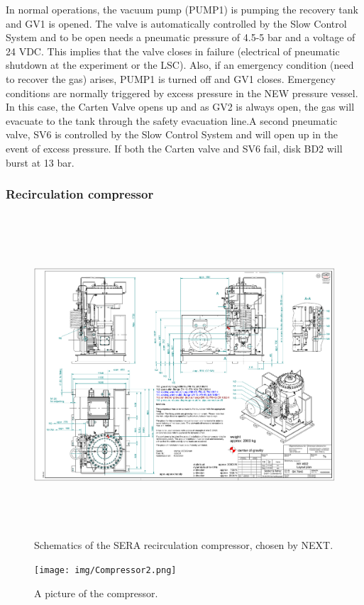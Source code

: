 In normal operations, the vacuum pump (PUMP1) is pumping the recovery tank and GV1 is opened. The valve is automatically controlled by the Slow Control System and to be open needs a pneumatic pressure of 4.5-5 bar and a voltage of 24 VDC. This implies that the valve closes in failure (electrical of pneumatic shutdown at the experiment or the LSC). Also, if an emergency condition (need to recover the gas) arises, PUMP1 is turned off and GV1 closes. Emergency conditions are normally triggered by excess pressure in the NEW pressure vessel. In this case, the Carten Valve opens up and as GV2 is always open, the gas will evacuate to the tank through the safety evacuation line.A second pneumatic valve, SV6 is controlled by the Slow Control System and will open up in the event of excess pressure. If both the Carten valve and SV6 fail, disk BD2 will burst at 13 bar. 

\subsubsection*{Recirculation compressor}

\begin{figure}[hpt!]
\centering
\includegraphics[height=12cm]{img/Pump.pdf}
\caption{Schematics of the SERA recirculation compressor, chosen by NEXT.} \label{fig:pump}
\end{figure}

\begin{figure}[hpt!]
\centering
\texttt{[image: img/Compressor2.png]}
\caption{A picture of the compressor.} \label{fig.sera}
\end{figure}


